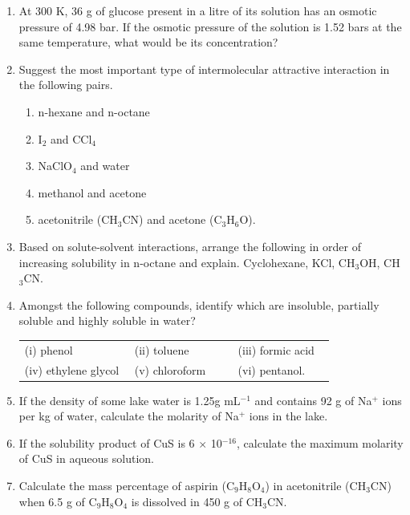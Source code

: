\documentclass[11pt,a4paper]{article}
\begin{document}
\noindent\begin{minipage}[t]{0.955\textwidth}
\begin{tcolorbox}[enhanced,frame hidden,colback=white,left=0pt,right=26pt,top=0pt,bottom=8pt,boxsep=0pt,arc=0pt,overlay={\fill[salmon,rounded corners=2pt] ([xshift=-10pt]frame.south east) rectangle (frame.north east);}]
\begin{enumerate}[label=\textbf{1.\arabic*},leftmargin=38pt,itemsep=3pt,topsep=0pt,start=22]
\item At 300 K, 36 g of glucose present in a litre of its solution has an osmotic pressure of 4.98 bar. If the osmotic pressure of the solution is 1.52 bars at the same temperature, what would be its concentration?
\item Suggest the most important type of intermolecular attractive interaction in the following pairs.
\begin{enumerate}[label=(\roman*),leftmargin=24pt,itemsep=0pt,topsep=2pt]
\item n-hexane and n-octane
\item I$_2$ and CCl$_4$
\item NaClO$_4$ and water
\item methanol and acetone
\item acetonitrile (CH$_3$CN) and acetone (C$_3$H$_6$O).
\end{enumerate}
\item Based on solute-solvent interactions, arrange the following in order of increasing solubility in n-octane and explain. Cyclohexane, KCl, CH$_3$OH, CH$_3$CN.
\item Amongst the following compounds, identify which are insoluble, partially soluble and highly soluble in water?\\[2pt]
\begin{tabular}{@{}p{0.34\linewidth}p{0.32\linewidth}p{0.30\linewidth}@{}}
\hspace*{0.3em}(i)\; phenol & (ii)\; toluene & (iii)\; formic acid\\
(iv)\; ethylene glycol & (v)\; chloroform & (vi)\; pentanol.
\end{tabular}
\item If the density of some lake water is 1.25g mL$^{-1}$ and contains 92 g of Na$^+$ ions per kg of water, calculate the molarity of Na$^+$ ions in the lake.
\item If the solubility product of CuS is 6 $\times$ 10$^{-16}$, calculate the maximum molarity of CuS in aqueous solution.
\item Calculate the mass percentage of aspirin (C$_9$H$_8$O$_4$) in acetonitrile (CH$_3$CN) when 6.5 g of C$_9$H$_8$O$_4$ is dissolved in 450 g of CH$_3$CN.

\end{enumerate}
\end{tcolorbox}
\end{minipage}
\end{document}
